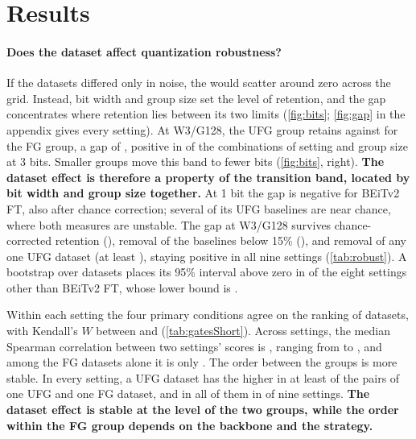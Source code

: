 \section{Results}
\label{sec:results}

\paragraph{Does the dataset affect quantization robustness?}
If the datasets differed only in noise, the  would scatter around zero across the grid.
Instead, bit width and group size set the level of retention, and the gap concentrates where retention lies between its two limits (\cref{fig:bits}; \cref{fig:gap} in the appendix gives every setting).
At W3/G128, the UFG group retains  against  for the FG group, a gap of , positive in  of the  combinations of setting and group size at 3 bits.
Smaller groups move this band to fewer bits (\cref{fig:bits}, right).
\textbf{The dataset effect is therefore a property of the transition band, located by bit width and group size together.}
At 1 bit the gap is negative for BEiTv2 FT, also after chance correction; several of its UFG baselines are near chance, where both measures are unstable.
The gap at W3/G128 survives chance-corrected retention (), removal of the  baselines below 15\% (), and removal of any one UFG dataset (at least ), staying positive in all nine settings (\cref{tab:robust}).
A bootstrap over datasets places its 95\% interval above zero in  of the eight settings other than BEiTv2 FT, whose lower bound is .

Within each setting the four primary conditions agree on the ranking of datasets, with Kendall's $W$ between  and  (\cref{tab:gatesShort}).
Across settings, the median Spearman correlation between two settings' scores is , ranging from  to , and among the FG datasets alone it is only .
The order between the groups is more stable.
In every setting, a UFG dataset has the higher  in at least  of the pairs of one UFG and one FG dataset, and in all of them in  of nine settings.
\textbf{The dataset effect is stable at the level of the two groups, while the order within the FG group depends on the backbone and the strategy.}


